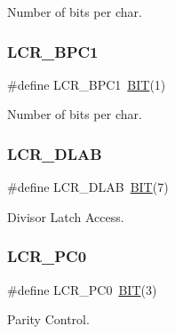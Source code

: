 Number of bits per char. 

\hypertarget{group___serial_ga4271f672ad1c921995a3868074747d19}{}\label{group___serial_ga4271f672ad1c921995a3868074747d19} 
\subsubsection{\texorpdfstring{L\+C\+R\+\_\+\+B\+P\+C1}{LCR\_BPC1}}
{\footnotesize\ttfamily \#define L\+C\+R\+\_\+\+B\+P\+C1~\hyperlink{group___serial_ga3a8ea58898cb58fc96013383d39f482c}{B\+IT}(1)}



Number of bits per char. 

\hypertarget{group___serial_ga1cf80a668c79b3081803063178f40920}{}\label{group___serial_ga1cf80a668c79b3081803063178f40920} 
\subsubsection{\texorpdfstring{L\+C\+R\+\_\+\+D\+L\+AB}{LCR\_DLAB}}
{\footnotesize\ttfamily \#define L\+C\+R\+\_\+\+D\+L\+AB~\hyperlink{group___serial_ga3a8ea58898cb58fc96013383d39f482c}{B\+IT}(7)}



Divisor Latch Access. 

\hypertarget{group___serial_ga5b25ad27007f83425b63a30298743f01}{}\label{group___serial_ga5b25ad27007f83425b63a30298743f01} 
\subsubsection{\texorpdfstring{L\+C\+R\+\_\+\+P\+C0}{LCR\_PC0}}
{\footnotesize\ttfamily \#define L\+C\+R\+\_\+\+P\+C0~\hyperlink{group___serial_ga3a8ea58898cb58fc96013383d39f482c}{B\+IT}(3)}



Parity Control. 

\hypertarget{group___serial_ga6ab1327cf213d22d2acc07b397c85f0f}{}\label{group___serial_ga6ab1327cf213d22d2acc07b397c85f0f} 
